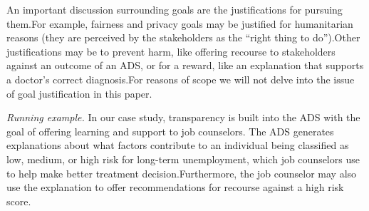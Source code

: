 \documentclass[sigconf, nonacm]{acmart}
\begin{document}
\begin{comment}
-  \textbf{Validity}.Validity refers to making sure that an AI is constructed correctly and is reasonable.It encompasses ideas like making sure the AI is reliable and robust ~\cite{doshi2017towards}.
-  \textbf{Trust}. In the context of an AI, trust refers knowing ``how often a model is right'' and ``for which examples it is right'' ~\cite{lipton2018mythos}.Importantly, trust is related to the adoption of an ADS ~\cite{rodolfa2020machine}.
-  \textbf{Learning and Support}.Learning and support refers to when the goal of transparency in an ADS is to satisfy human curiosity, or increase understanding about how an AI is supporting a real-world recommendation~\cite{rodolfa2020machine, molnar2019}.
-  \textbf{Recourse}.Recourse refers to allowing a stakeholder to take some action against the outcome of an AI ~\cite{rodolfa2020machine}.
-  \textbf{Fairness}.Fairness refers to making sure that an AI is fair based on some metric, and transparency can be used to find bias within a model.
-  \textbf{Privacy}.Privacy refers to making sure that an AI respects the data privacy of an individual.Transparency may be used to understand if privacy is being respected in an AI.
\end{comment}

An important discussion surrounding goals are the justifications for pursuing them.For example, fairness and privacy goals may be justified for humanitarian reasons (they are perceived by the stakeholders as the ``right thing to do'').Other justifications may be to prevent harm, like offering recourse to stakeholders against an outcome of an ADS, or for a reward, like an explanation that supports a doctor's correct diagnosis.For reasons of scope we will not delve into the issue of goal justification in this paper.

\emph{Running example.} In our case study, transparency is built into the ADS with the goal of offering learning and support to job counselors. The ADS generates explanations about what factors contribute to an individual being classified as low, medium, or high risk for long-term unemployment, which job counselors use to help make better treatment decision.Furthermore, the job counselor may also use the explanation to offer recommendations for recourse against a high risk score.
\end{document}
